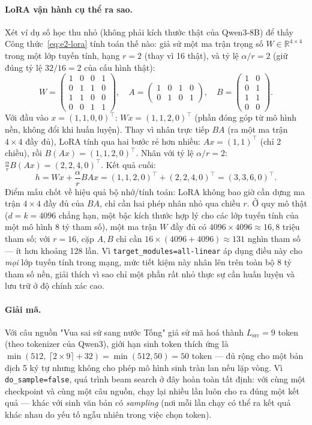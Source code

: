 \paragraph{LoRA vận hành cụ thể ra sao.} Xét ví dụ số học thu nhỏ (không phải kích thước
thật của Qwen3-8B) để thấy Công thức~\ref{eq:e2-lora} tính toán thế nào: giả sử một ma
trận trọng số $W \in \mathbb{R}^{4\times4}$ trong một lớp tuyến tính, hạng $r=2$ (thay vì
16 thật), và tỷ lệ $\alpha/r = 2$ (giữ đúng tỷ lệ $32/16=2$ của cấu hình thật):
\[
W=\begin{pmatrix}1&0&0&1\\0&1&1&0\\1&1&0&0\\0&0&1&1\end{pmatrix},\quad
A=\begin{pmatrix}1&0&1&0\\0&1&0&1\end{pmatrix},\quad
B=\begin{pmatrix}1&0\\0&1\\1&1\\0&0\end{pmatrix}.
\]
Với đầu vào $x=(1,1,0,0)^\top$: $Wx=(1,1,2,0)^\top$ (phần đóng góp từ mô hình nền, không
đổi khi huấn luyện). Thay vì nhân trực tiếp $BA$ (ra một ma trận $4\times4$ đầy đủ), LoRA
tính qua hai bước rẻ hơn nhiều: $Ax=(1,1)^\top$ (chỉ 2 chiều), rồi
$B(Ax)=(1,1,2,0)^\top$. Nhân với tỷ lệ $\alpha/r=2$:
$\frac{\alpha}{r}B(Ax) = (2,2,4,0)^\top$. Kết quả cuối:
\[
h = Wx + \frac{\alpha}{r}BAx = (1,1,2,0)^\top + (2,2,4,0)^\top = (3,3,6,0)^\top.
\]
Điểm mấu chốt về hiệu quả bộ nhớ/tính toán: LoRA không bao giờ cần dựng ma trận $4\times4$
đầy đủ của $BA$, chỉ cần hai phép nhân nhỏ qua chiều $r$. Ở quy mô thật ($d=k=4096$ chẳng
hạn, một bậc kích thước hợp lý cho các lớp tuyến tính của một mô hình 8 tỷ tham số), một
ma trận $W$ đầy đủ có $4096 \times 4096 \approx 16{,}8$ triệu tham số; với $r=16$, cặp
$A,B$ chỉ cần $16\times(4096+4096) \approx 131$ nghìn tham số — ít hơn khoảng 128 lần.
Vì \texttt{target\_modules=all-linear} áp dụng điều này cho \emph{mọi} lớp tuyến tính
trong mạng, mức tiết kiệm này nhân lên trên toàn bộ 8 tỷ tham số nền, giải thích vì sao
chỉ một phần rất nhỏ thực sự cần huấn luyện và lưu trữ ở độ chính xác cao.

\paragraph{Giải mã.} Với câu nguồn "Vua sai sứ sang nước Tống" giả sử mã hoá thành
$L_{\text{src}}=9$ token (theo tokenizer của Qwen3), giới hạn sinh token thích ứng là
$\min(512,\ \lceil 2\times 9\rceil + 32) = \min(512, 50) = 50$ token — đủ rộng cho một
bản dịch 5 ký tự nhưng không cho phép mô hình sinh tràn lan nếu lặp vòng. Vì
\texttt{do\_sample=false}, quá trình beam search ở đây hoàn toàn tất định: với cùng một
checkpoint và cùng một câu nguồn, chạy lại nhiều lần luôn cho ra đúng một kết quả — khác
với sinh văn bản có \textit{sampling} (nơi mỗi lần chạy có thể ra kết quả khác nhau do
yếu tố ngẫu nhiên trong việc chọn token).


